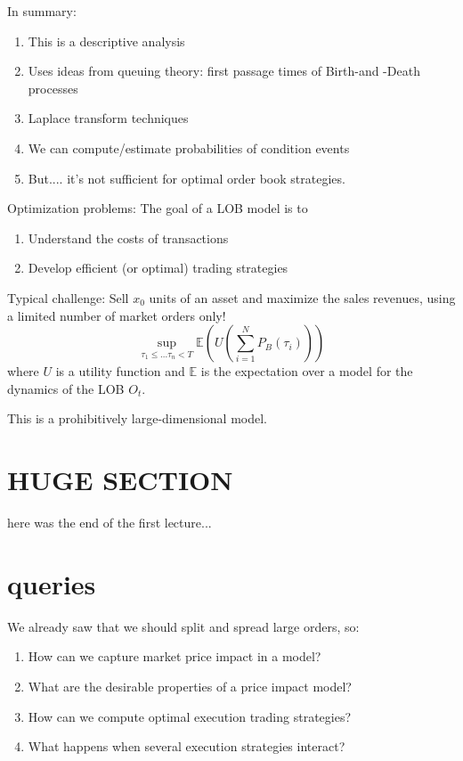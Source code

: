 In summary:
\begin{enumerate}
	\item This is a descriptive analysis
	\item Uses ideas from queuing theory: first passage times of Birth-and -Death processes
	\item Laplace transform techniques
	\item We can compute/estimate probabilities of condition events
	\item But.... it's not sufficient for optimal order book strategies.
\end{enumerate}

Optimization problems: The goal of a LOB model is to
\begin{enumerate}
	\item Understand the costs of transactions
	\item Develop efficient (or optimal) trading strategies
\end{enumerate}

Typical challenge: Sell $x_0$ units of an asset and maximize the sales revenues, using a limited number of market orders only!
\begin{equation}
	\sup_{\tau_1 \leq ... \tau_n < T} \mathbb{E}(U(\sum_{i=1}^N P_B(\tau_i)))
\end{equation}
where $U$ is a utility function and $\mathbb{E}$ is the expectation over a model for the dynamics of the LOB $O_t$.

This is a prohibitively large-dimensional model.

\section{HUGE SECTION}
here was the end of the first lecture...
\section{queries}
We already saw that we should split and spread large orders, so:
\begin{enumerate}
	\item How can we capture market price impact in a model?
	\item What are the desirable properties of a price impact model?
	\item How can we compute optimal execution trading strategies?
	\item What happens when several execution strategies interact?
\end{enumerate}

